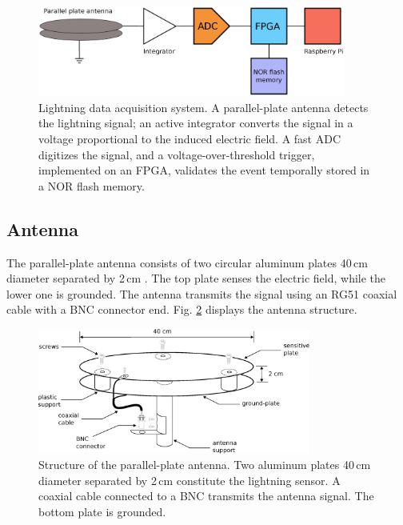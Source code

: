 \documentclass[letterpaper,12pt]{article}
\begin{document}
\begin{figure}[h!]
\begin{center}
\includegraphics[width=0.9\textwidth]{Figures/Fast.eps}
\caption{Lightning data acquisition system. A parallel-plate antenna detects the lightning signal; an active integrator converts the signal in a voltage proportional to the induced electric field. A fast ADC digitizes the signal, and a voltage-over-threshold trigger, implemented on an FPGA, validates the event temporally stored in a NOR flash memory.}
\label{diagrma_cam_rap}
\end{center}
\end{figure}

\subsection{Antenna}

The parallel-plate antenna consists of two circular aluminum plates 40\,cm diameter separated by 2\,cm \cite{salgado2020}. The top plate senses the electric field, while the lower one is grounded. The antenna transmits the signal using an RG51 coaxial cable with a BNC connector end. Fig. \ref{antena_rap} displays the antenna structure.

\begin{figure}[h!]
\begin{center}
\includegraphics[width=0.8\textwidth]{Figures/Parallel_plate.eps}
\caption{Structure of the parallel-plate antenna. Two aluminum plates 40\,cm diameter separated by 2\,cm constitute the lightning sensor. A coaxial cable connected to a BNC transmits the antenna signal. The bottom plate is grounded.}
\label{antena_rap}
\end{center}
\end{figure}
\end{document}
